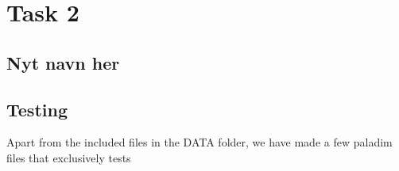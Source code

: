 \section{Task 2}

\subsection{Nyt navn her}

\subsection{Testing}
Apart from the included files in the DATA folder, we have made a few paladim
files that exclusively tests 
